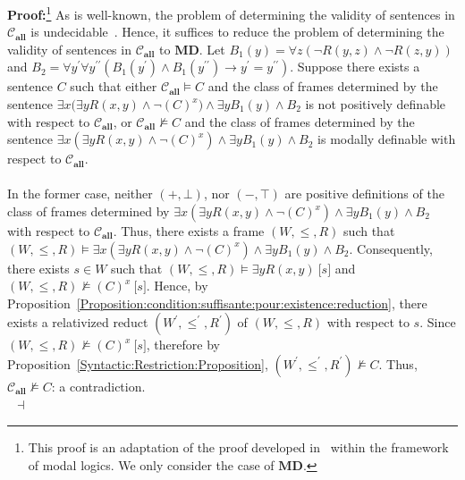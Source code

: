 \documentclass[draft]{article}
\newenvironment{proof}{{\bf Proof:}}{~$\dashv$\\}
\def\allfra{\mathbf{all}}
\begin{document}
\begin{proof}\footnote{This proof is an adaptation of the proof developed in~\cite{Balbiani:Tinchev:2017} within the framework of modal logics.
We only consider the case of $\mathbf{MD}$.}
%
%
As is well-known, the problem of determining the validity of sentences in ${\mathcal C}_{\allfra}$ is undecidable~\cite{Kalmar:1937}.
Hence, it suffices to reduce the problem of determining the validity of sentences in ${\mathcal C}_{\allfra}$ to $\mathbf{MD}$.
Let $B_{1}(y){=}{\forall z}({\neg}R(y,z){\wedge}{\neg}R(z,y))$ and $B_{2}{=}{\forall y^{\prime}}{\forall y^{\prime\prime}}(B_{1}(y^{\prime}){\wedge}B_{1}(y^{\prime\prime}){\rightarrow}y^{\prime}{=}y^{\prime\prime})$.
Suppose there exists a sentence $C$ such that either ${\mathcal C}_{\allfra}{\models}C$ and the class of frames determined by the sentence ${\exists x}({\exists y}R(x,y){\wedge}
%
%
%
%
%
%
%
$\linebreak$
%
%
%
%
%
%
{\neg}(C)^{x}){\wedge}{\exists y}B_{1}(y){\wedge}B_{2}$ is not positively definable with respect to ${\mathcal C}_{\allfra}$, or ${\mathcal C}_{\allfra}{\not\models}C$ and the class of frames determined by the sentence ${\exists x}({\exists y}R(x,y){\wedge}{\neg}(C)^{x}){\wedge}{\exists y}B_{1}(y){\wedge}B_{2}$ is modally definable with respect to ${\mathcal C}_{\allfra}$.
%
%
\\
\\
%
%
In the former case, neither $(+,\bot)$, nor $(-,\top)$ are positive definitions of the class of frames determined by ${\exists x}({\exists y}R(x,y){\wedge}{\neg}(C)^{x}){\wedge}{\exists y}B_{1}(y){\wedge}B_{2}$ with respect to ${\mathcal C}_{\allfra}$.
Thus, there exists a frame $(W,{\leq},{R})$ such that $(W,{\leq},{R}){\models}{\exists x}({\exists y}R(x,y){\wedge}{\neg}(C)^{x}){\wedge}
%
%
%
%
%
%
%
$\linebreak$
%
%
%
%
%
%
{\exists y}B_{1}(y){\wedge}B_{2}$.
Consequently, there exists $s{\in}W$ such that $(W,{\leq},{R}){\models}{\exists y}R(x,y)\ \lbrack s\rbrack$ and $(W,{\leq},{R}){\not\models}(C)^{x}\ \lbrack s\rbrack$.
Hence, by Proposition~\ref{Proposition:condition:suffisante:pour:existence:reduction}, there exists a relativized reduct $(W^{\prime},{\leq^{\prime}},{R^{\prime}})$ of $(W,{\leq},{R})$ with respect to $s$.
Since $(W,{\leq},{R}){\not\models}(C)^{x}\ \lbrack s\rbrack$, therefore by Proposition~\ref{Syntactic:Restriction:Proposition}, $(W^{\prime},{\leq^{\prime}},{R^{\prime}}){\not\models}C$.
Thus, ${\mathcal C}_{\allfra}\not\models C$: a contradiction.
%
%
\\

\end{proof}
\end{document}
